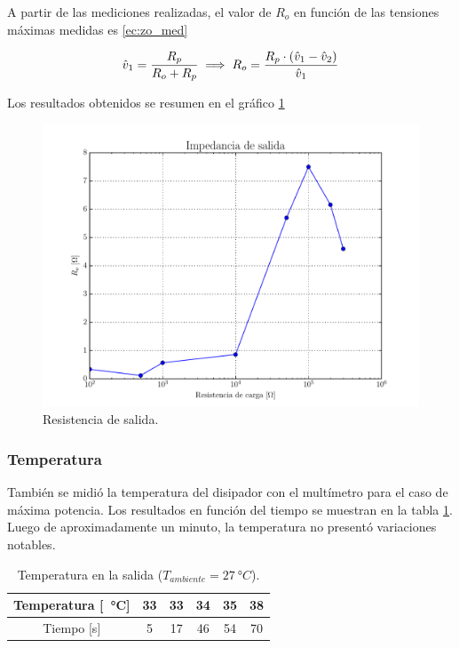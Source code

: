 A partir de las mediciones realizadas, el valor de $R_o$ en función de las tensiones máximas medidas es \eqref{ec:zo_med}

\begin{equation}
	\centering
	\hat{v}_1 = \frac{R_p}{R_o + R_p} \implies R_o = \frac{R_p \cdot (\hat{v}_1 - \hat{v}_2)}{\hat{v}_1}
	\label{eq:zo_med}
\end{equation}


Los resultados obtenidos se resumen en el gráfico \ref{fig:zo_med}

\begin{figure}[H]
	\centering
	\includegraphics[scale=0.5]{./Figuras/med_zo.pdf}
	\caption{Resistencia de salida.}
	\label{fig:zo_med}
\end{figure}


\subsubsection{Temperatura}
También se midió la temperatura del disipador con el multímetro para el caso de máxima potencia. Los resultados en función del tiempo se muestran en la tabla \ref{tab.temp}. Luego de aproximadamente un minuto, la temperatura no presentó variaciones notables. 

\begin{table}[H]
	\centering
	\begin{tabular}{cccccc}
	\toprule
		Temperatura [\SI{}{\degree}C] & 33 & 33 & 34 & 35 & 38 \\
		\midrule
		Tiempo [s] & 5 & 17 & 46 & 54 & 70 \\
		\bottomrule
	\end{tabular}
	\label{tab.temp}
	\caption{Temperatura en la salida ($T_{ambiente}= \SI{27}{\degree}C$).}
\end{table}


